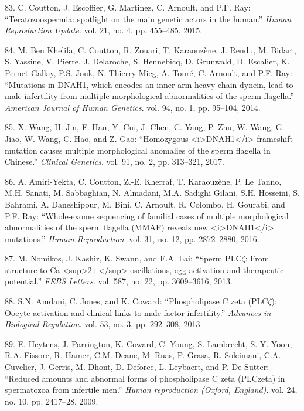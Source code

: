 \documentclass[12pt,a4paper,twoside]{ugathesis}
\theoremstyle{definition}
\theoremstyle{definition}
\theoremstyle{definition}
\theoremstyle{remark}
\begin{document}
\hypertarget{ref-Coutton2015}{}
83. C. Coutton, J. Escoffier, G. Martinez, C. Arnoult, and P.F. Ray:
``Teratozoospermia: spotlight on the main genetic actors in the human.''
\emph{Human Reproduction Update}. vol. 21, no. 4, pp. 455--485, 2015.

\hypertarget{ref-BenKhelifa2014}{}
84. M. Ben Khelifa, C. Coutton, R. Zouari, T. Karaouzène, J. Rendu, M.
Bidart, S. Yassine, V. Pierre, J. Delaroche, S. Hennebicq, D. Grunwald,
D. Escalier, K. Pernet-Gallay, P.S. Jouk, N. Thierry-Mieg, A. Touré, C.
Arnoult, and P.F. Ray: ``Mutations in DNAH1, which encodes an inner arm
heavy chain dynein, lead to male infertility from multiple morphological
abnormalities of the sperm flagella.'' \emph{American Journal of Human
Genetics}. vol. 94, no. 1, pp. 95--104, 2014.

\hypertarget{ref-Wang2017}{}
85. X. Wang, H. Jin, F. Han, Y. Cui, J. Chen, C. Yang, P. Zhu, W. Wang,
G. Jiao, W. Wang, C. Hao, and Z. Gao: ``Homozygous
\textless{}i\textgreater{}DNAH1\textless{}/i\textgreater{} frameshift
mutation causes multiple morphological anomalies of the sperm flagella
in Chinese.'' \emph{Clinical Genetics}. vol. 91, no. 2, pp. 313--321,
2017.

\hypertarget{ref-Amiri-Yekta2016}{}
86. A. Amiri-Yekta, C. Coutton, Z.-E. Kherraf, T. Karaouzène, P. Le
Tanno, M.H. Sanati, M. Sabbaghian, N. Almadani, M.A. Sadighi Gilani,
S.H. Hosseini, S. Bahrami, A. Daneshipour, M. Bini, C. Arnoult, R.
Colombo, H. Gourabi, and P.F. Ray: ``Whole-exome sequencing of familial
cases of multiple morphological abnormalities of the sperm flagella
(MMAF) reveals new
\textless{}i\textgreater{}DNAH1\textless{}/i\textgreater{} mutations.''
\emph{Human Reproduction}. vol. 31, no. 12, pp. 2872--2880, 2016.

\hypertarget{ref-Nomikos2013}{}
87. M. Nomikos, J. Kashir, K. Swann, and F.A. Lai: ``Sperm PLC\(\zeta\):
From structure to Ca
\textless{}sup\textgreater{}2+\textless{}/sup\textgreater{}
oscillations, egg activation and therapeutic potential.'' \emph{FEBS
Letters}. vol. 587, no. 22, pp. 3609--3616, 2013.

\hypertarget{ref-Amdani2013}{}
88. S.N. Amdani, C. Jones, and K. Coward: ``Phospholipase C zeta
(PLC\(\zeta\)): Oocyte activation and clinical links to male factor
infertility.'' \emph{Advances in Biological Regulation}. vol. 53, no. 3,
pp. 292--308, 2013.

\hypertarget{ref-Heytens2009}{}
89. E. Heytens, J. Parrington, K. Coward, C. Young, S. Lambrecht, S.-Y.
Yoon, R.A. Fissore, R. Hamer, C.M. Deane, M. Ruas, P. Grasa, R.
Soleimani, C.A. Cuvelier, J. Gerris, M. Dhont, D. Deforce, L. Leybaert,
and P. De Sutter: ``Reduced amounts and abnormal forms of phospholipase
C zeta (PLCzeta) in spermatozoa from infertile men.'' \emph{Human
reproduction (Oxford, England)}. vol. 24, no. 10, pp. 2417--28, 2009.
\end{document}
